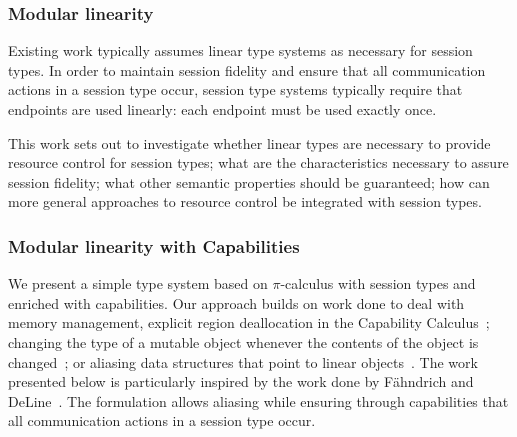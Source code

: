 \begin{frame}\frametitle{Modular linearity}
  Existing work typically assumes linear type systems as necessary for session types. In order to maintain session fidelity and ensure that all communication actions in a session type occur, session type systems typically require that endpoints are used linearly: each endpoint must be used exactly once.

  This work sets out to investigate whether linear types are necessary to provide resource control for session types; what are the characteristics necessary to assure session fidelity; what other semantic properties should be guaranteed; how can more general approaches to resource control be integrated with session types.



\end{frame}

\begin{frame}\frametitle{Modular linearity with Capabilities}
  We present a simple type system based on $\pi$-calculus with session types and enriched with capabilities. Our approach builds on work done to deal with memory management, explicit region deallocation in the Capability Calculus~\cite{Crary:1999:TMM:292540.292564}; changing the type of a mutable object whenever the contents of the object is changed~\cite{Ahmed:2007:LLL:1365997.1366003}; or aliasing data structures that point to linear objects~\cite{FahndrichM:adofpl1}. The work presented below is particularly inspired by the work done by F\"ahndrich and DeLine~\cite{FahndrichM:adofpl1}. The formulation allows aliasing while ensuring through capabilities that all communication actions in a session type occur.
\end{frame}

